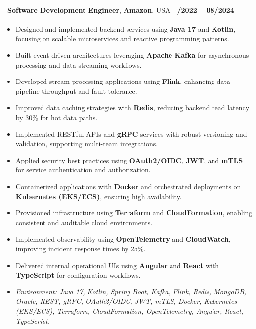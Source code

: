 \documentclass[letterpaper,11pt]{article}
\makeatletter
\newcommand{\resumeItem}[1]{
  \item\footnotesize{
    {#1 \vspace{-2pt}}
  }
}
\newcommand{\resumeSubheading}[4]{
  \vspace{-2pt}\item
    \begin{tabular*}{1.0\textwidth}[t]{l@{\extracolsep{\fill}}r}
      \textbf{\fontsize{10pt}{14pt}\selectfont #3}, \textbf{\fontsize{10pt}{14pt}\selectfont #1}, \fontsize{10pt}{14pt}\selectfont #4 & \textbf{\fontsize{10pt}{14pt}\selectfont #2} \\
    \end{tabular*}\vspace{-7pt}
}
\newcommand{\resumeItemListStart}{\begin{itemize}[leftmargin=*]}
\newcommand{\resumeItemListEnd}{\end{itemize}\vspace{-5pt}}
\makeatother
\begin{document}
\resumeSubheading
{Amazon}{10/2022 -- 08/2024}
{Software Development Engineer}{USA}
\resumeItemListStart
  \resumeItem{Designed and implemented backend services using \textbf{Java 17} and \textbf{Kotlin}, focusing on scalable microservices and reactive programming patterns.}
  \resumeItem{Built event-driven architectures leveraging \textbf{Apache Kafka} for asynchronous processing and data streaming workflows.}
  \resumeItem{Developed stream processing applications using \textbf{Flink}, enhancing data pipeline throughput and fault tolerance.}
  \resumeItem{Improved data caching strategies with \textbf{Redis}, reducing backend read latency by 30\% for hot data paths.}
  \resumeItem{Implemented RESTful APIs and \textbf{gRPC} services with robust versioning and validation, supporting multi-team integrations.}
  \resumeItem{Applied security best practices using \textbf{OAuth2/OIDC}, \textbf{JWT}, and \textbf{mTLS} for service authentication and authorization.}
  \resumeItem{Containerized applications with \textbf{Docker} and orchestrated deployments on \textbf{Kubernetes (EKS/ECS)}, ensuring high availability.}
  \resumeItem{Provisioned infrastructure using \textbf{Terraform} and \textbf{CloudFormation}, enabling consistent and auditable cloud environments.}
  \resumeItem{Implemented observability using \textbf{OpenTelemetry} and \textbf{CloudWatch}, improving incident response times by 25\%.}
  \resumeItem{Delivered internal operational UIs using \textbf{Angular} and \textbf{React} with \textbf{TypeScript} for configuration workflows.}
  \resumeItem{\textit{Environment: Java 17, Kotlin, Spring Boot, Kafka, Flink, Redis, MongoDB, Oracle, REST, gRPC, OAuth2/OIDC, JWT, mTLS, Docker, Kubernetes (EKS/ECS), Terraform, CloudFormation, OpenTelemetry, Angular, React, TypeScript.}}
\resumeItemListEnd
\end{document}
